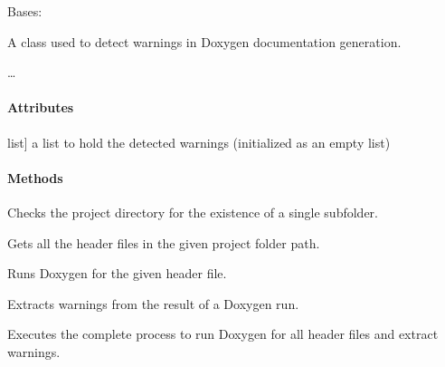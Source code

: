 \documentclass[letterpaper,10pt,english]{sphinxmanual}
\begin{document}
\begin{fulllineitems}
\label{\detokenize{main.doxygen_management:main.doxygen_management.doxy_warning_detector.DoxyWarningDetector}}
\pysigstartsignatures
{}
\pysigstopsignatures
\sphinxAtStartPar
Bases: 

\sphinxAtStartPar
A class used to detect warnings in Doxygen documentation generation.

\sphinxAtStartPar
…


\paragraph{Attributes}
\label{\detokenize{main.doxygen_management:attributes}}\begin{description}
\sphinxlineitem{warnings\_list}{[}list{]}
\sphinxAtStartPar
a list to hold the detected warnings (initialized as an empty list)

\end{description}


\paragraph{Methods}
\label{\detokenize{main.doxygen_management:methods}}\begin{description}
\sphinxAtStartPar
Checks the project directory for the existence of a single subfolder.

\sphinxAtStartPar
Gets all the header files in the given project folder path.

\sphinxAtStartPar
Runs Doxygen for the given header file.

\sphinxAtStartPar
Extracts warnings from the result of a Doxygen run.

\sphinxAtStartPar
Executes the complete process to run Doxygen for all header files and extract warnings.

\end{description}


\end{fulllineitems}
\end{document}
